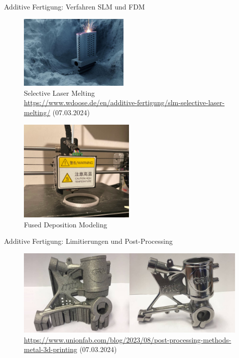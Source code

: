 \documentclass[../slides.tex]{subfiles}
\begin{document}
\begin{frame}{Additive Fertigung: Verfahren SLM und FDM}
  \begin{minipage}[]{0.49\textwidth}
    \begin{figure}[]
      \includegraphics[width=150pt]{img_niklas/csm_h_bearb_LASERTEC_SLM_Blade_Powder_e24c562ac8.jpg}
      \caption{Selective Laser Melting \\ \tiny{\url{https://www.wdoose.de/en/additive-fertigung/slm-selective-laser-melting/} (07.03.2024)}}
      \label{fig:slm}
    \end{figure}
  \end{minipage}
  \begin{minipage}[]{0.49\textwidth}
    \begin{figure}[]
      \includegraphics[height=140pt]{img_niklas/3d_printer.jpg}
      \caption{Fused Deposition Modeling}
    \end{figure}
  \end{minipage}
\end{frame}

\begin{frame}{Additive Fertigung: Limitierungen und Post-Processing}
  \begin{minipage}[t]{\textwidth}
    \begin{figure}[]
      \includegraphics[width=\textwidth]{img_niklas/image-32-1024x384.png}
      \caption{\tiny{\url{https://www.unionfab.com/blog/2023/08/post-processing-methods-metal-3d-printing} (07.03.2024)}}
      \label{fig:post_processing}
    \end{figure}
  \end{minipage}
\end{frame}
\end{document}
